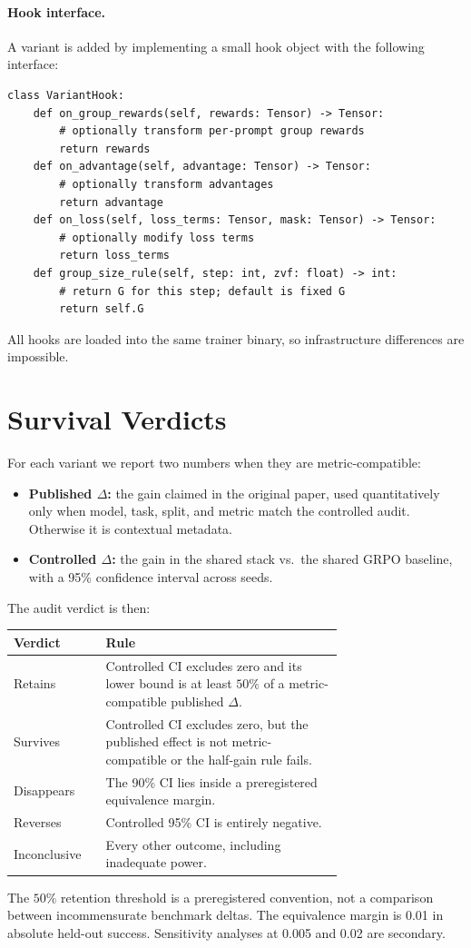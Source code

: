 \documentclass[11pt]{article}
\begin{document}
\paragraph{Hook interface.} A variant is added by implementing a small hook
object with the following interface:
\begin{verbatim}
class VariantHook:
    def on_group_rewards(self, rewards: Tensor) -> Tensor:
        # optionally transform per-prompt group rewards
        return rewards
    def on_advantage(self, advantage: Tensor) -> Tensor:
        # optionally transform advantages
        return advantage
    def on_loss(self, loss_terms: Tensor, mask: Tensor) -> Tensor:
        # optionally modify loss terms
        return loss_terms
    def group_size_rule(self, step: int, zvf: float) -> int:
        # return G for this step; default is fixed G
        return self.G
\end{verbatim}
All hooks are loaded into the same trainer binary, so infrastructure differences
are impossible.

\section{Survival Verdicts}
\label{sec:verdict}


For each variant we report two numbers when they are metric-compatible:
\begin{itemize}[leftmargin=1.4em, itemsep=2pt]
  \item \textbf{Published $\Delta$:} the gain claimed in the original paper,
    used quantitatively only when model, task, split, and metric match the
    controlled audit. Otherwise it is contextual metadata.
  \item \textbf{Controlled $\Delta$:} the gain in the shared stack vs.\ the
    shared GRPO baseline, with a 95\% confidence interval across seeds.
\end{itemize}
The audit verdict is then:
\begin{center}
\small
\begin{tabular}{@{}lp{0.72\linewidth}@{}}
\toprule
\textbf{Verdict} & \textbf{Rule}\\
\midrule
Retains & Controlled CI excludes zero and its lower bound is at least $50\%$
  of a metric-compatible published $\Delta$.\\
Survives & Controlled CI excludes zero, but the published effect is not
  metric-compatible or the half-gain rule fails.\\
Disappears & The 90\% CI lies inside a preregistered equivalence margin.\\
Reverses & Controlled 95\% CI is entirely negative.\\
Inconclusive & Every other outcome, including inadequate power.\\
\bottomrule
\end{tabular}
\end{center}
The $50\%$ retention threshold is a preregistered convention, not a comparison
between incommensurate benchmark deltas. The equivalence margin is 0.01 in
absolute held-out success. Sensitivity analyses at 0.005 and 0.02 are secondary.
\end{document}
